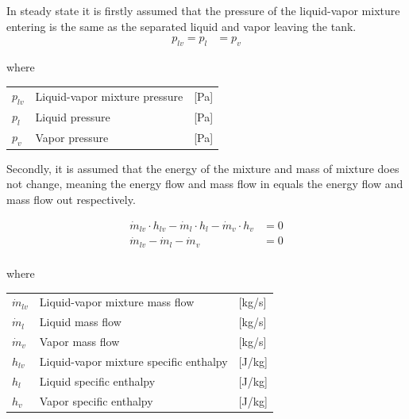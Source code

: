 In steady state it is firstly assumed that the pressure of the liquid-vapor mixture entering is the same as the separated liquid and vapor leaving the tank.
\begin{align}
	p_{lv} 	= p_{l}					&  = p_{v}
	\label{eq:Flash_tank_pressure}
\end{align}

where

\begin{center}
	\begin{tabular}{l p{8cm} l}
		$p_{lv}$				&  Liquid-vapor mixture pressure		& [\si{Pa}]\\
		$p_{l}$					&  Liquid pressure 						& [\si{Pa}] \\
		$p_{v}$					&  Vapor pressure						& [\si{Pa}]\\

	\end{tabular}
\end{center}


Secondly, it is assumed that the energy of the mixture and mass of mixture does not change, meaning the energy flow and mass flow in equals the energy flow and mass flow out respectively.

\begin{align}
	\dot{m}_{lv} \cdot  h_{lv}  - \dot{m}_{l} \cdot  h_{l} - \dot{m}_{v} \cdot  h_{v} & = 0 \label{eq:Flash_tank_energyflow} \\
	\dot{m}_{lv} - \dot{m}_{l} - \dot{m}_{v} & = 0  \label{eq:Flash_tank_massflow} \\
\end{align}

where

\begin{center}
	\begin{tabular}{l p{8cm} l}
		$\dot{m}_{lv}$			&  Liquid-vapor mixture mass flow			& [\si{kg}/\si{s}]\\
		$\dot{m}_{l}$			&  Liquid mass flow 						& [\si{kg}/\si{s}] \\
		$\dot{m}_{v}$			&  Vapor mass flow							& [\si{kg}/\si{s}]\\
		$h_{lv}$				&  Liquid-vapor mixture specific enthalpy	& [\si{J}/\si{kg}]\\
		$h_{l}$					&  Liquid specific enthalpy 				& [\si{J}/\si{kg}] \\
		$h_{v}$					&  Vapor specific enthalpy					& [\si{J}/\si{kg}]\\

	\end{tabular}
\end{center}


